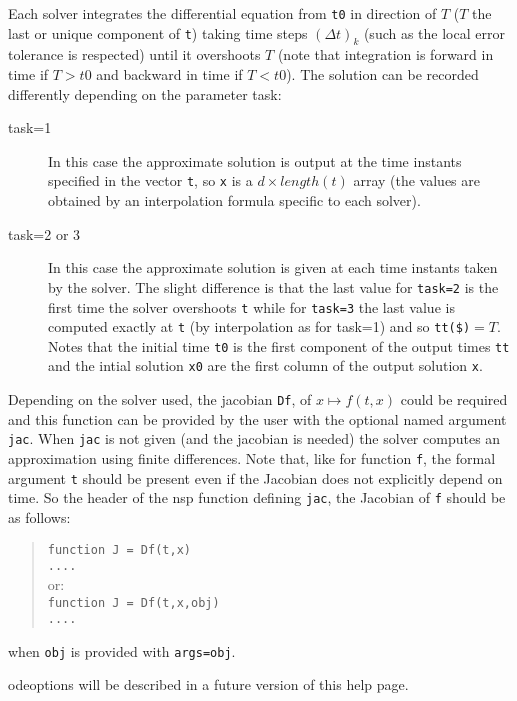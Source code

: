 \begin{mandescription}
Each solver integrates the differential equation from \verb+t0+ in
direction of $T$ ($T$ the last or unique component of \verb+t+) taking 
time steps $(\Delta t)_k$ (such as the local error tolerance is respected) 
until it overshoots $T$ (note that integration is forward in time if 
$T>t0$ and backward in time if $T<t0$). The solution can be recorded
differently depending on the parameter task:
\begin{description}
\item[task=1] In this case the approximate solution is output
at the time instants specified in the vector {\tt t}, so \verb+x+ is
a $d \times length(t)$ array (the values are obtained by an interpolation
formula specific to each solver).

\item[task=2 or 3] In this case the approximate solution is given at each
time instants taken by the solver. The slight difference is that the last
value for \verb+task=2+ is the first time the solver overshoots \verb+t+
while for \verb+task=3+ the last value is computed exactly at  \verb+t+
(by interpolation as for task=1) and so \verb+tt($)+$=T$. Notes that the 
initial time \verb+t0+ is the first component of the output times \verb+tt+
and the intial solution \verb+x0+ are the first column of the output
solution \verb+x+.    
\end{description}

 Depending on the solver used, the jacobian 
\verb+Df+, of $x \mapsto f(t,x)$ could be required and this function can be 
provided by the user with the optional named argument \verb+jac+. When 
\verb+jac+ is not given (and the jacobian is needed) the solver computes an 
approximation using finite differences. Note that, like for function \verb+f+, 
the formal argument \verb+t+ should be present even if
the Jacobian does not explicitly depend on time. So the header of
the nsp function defining \verb+jac+, the Jacobian of \verb+f+ should be as follows:
\begin{quote}
{\tt function J = Df(t,x) \\
      ....}\\
or:\\
{\tt function J = Df(t,x,obj) \\
     ....}
\end{quote}
when {\tt obj} is provided with {\tt args=obj}.

odeoptions will be described in a future version of this help page.

\end{mandescription} 


